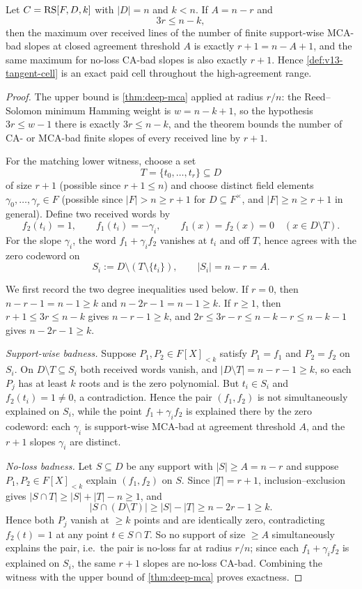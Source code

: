 \begin{proposition}\label{prop:v13-tangent}
Let $C=\mathrm{RS}[F,D,k]$ with $|D|=n$ and $k<n$.  If $A=n-r$ and
\[
        3r\le n-k,
\]
then the maximum over received lines of the number of finite support-wise MCA-bad slopes at closed agreement threshold $A$ is exactly $r+1=n-A+1$, and the same maximum for no-loss CA-bad slopes is also exactly $r+1$.  Hence \cref{def:v13-tangent-cell} is an exact paid cell throughout the high-agreement range.
\end{proposition}

\begin{proof}
The upper bound is \cref{thm:deep-mca} applied at radius $r/n$: the Reed--Solomon minimum Hamming weight is $w=n-k+1$, so the hypothesis $3r\le w-1$ there is exactly $3r\le n-k$, and the theorem bounds the number of CA- or MCA-bad finite slopes of every received line by $r+1$.

For the matching lower witness, choose a set
\[
        T=\{t_0,\ldots,t_r\}\subseteq D
\]
of size $r+1$ \textup(possible since $r+1\le n$\textup) and choose distinct field elements $\gamma_0,\ldots,\gamma_r\in F$ \textup(possible since $|F|>n\ge r+1$ for $D\subseteq F^\times$, and $|F|\ge n\ge r+1$ in general\textup).  Define two received words by
\[
        f_2(t_i)=1,
        \qquad
        f_1(t_i)=-\gamma_i,
        \qquad
        f_1(x)=f_2(x)=0\quad (x\in D\setminus T).
\]
For the slope $\gamma_i$, the word $f_1+\gamma_i f_2$ vanishes at $t_i$ and off $T$, hence agrees with the zero codeword on
\[
        S_i:=D\setminus (T\setminus\{t_i\}),
        \qquad |S_i|=n-r=A .
\]

We first record the two degree inequalities used below.  If $r=0$, then $n-r-1=n-1\ge k$ and $n-2r-1=n-1\ge k$.  If $r\ge1$, then $r+1\le 3r\le n-k$ gives $n-r-1\ge k$, and $2r\le 3r-r\le n-k-r\le n-k-1$ gives $n-2r-1\ge k$.

\emph{Support-wise badness.}  Suppose $P_1,P_2\in F[X]_{<k}$ satisfy $P_1=f_1$ and $P_2=f_2$ on $S_i$.  On $D\setminus T\subseteq S_i$ both received words vanish, and $|D\setminus T|=n-r-1\ge k$, so each $P_j$ has at least $k$ roots and is the zero polynomial.  But $t_i\in S_i$ and $f_2(t_i)=1\ne0$, a contradiction.  Hence the pair $(f_1,f_2)$ is not simultaneously explained on $S_i$, while the point $f_1+\gamma_i f_2$ is explained there by the zero codeword: each $\gamma_i$ is support-wise MCA-bad at agreement threshold $A$, and the $r+1$ slopes $\gamma_i$ are distinct.

\emph{No-loss badness.}  Let $S\subseteq D$ be any support with $|S|\ge A=n-r$ and suppose $P_1,P_2\in F[X]_{<k}$ explain $(f_1,f_2)$ on $S$.  Since $|T|=r+1$, inclusion--exclusion gives $|S\cap T|\ge|S|+|T|-n\ge1$, and
\[
        |S\cap(D\setminus T)|\ge |S|-|T|\ge n-2r-1\ge k .
\]
Hence both $P_j$ vanish at $\ge k$ points and are identically zero, contradicting $f_2(t)=1$ at any point $t\in S\cap T$.  So no support of size $\ge A$ simultaneously explains the pair, i.e.\ the pair is no-loss far at radius $r/n$; since each $f_1+\gamma_if_2$ is explained on $S_i$, the same $r+1$ slopes are no-loss CA-bad.  Combining the witness with the upper bound of \cref{thm:deep-mca} proves exactness.
\end{proof}


